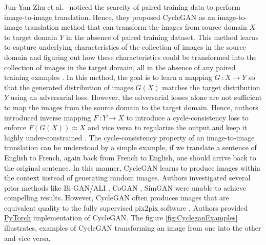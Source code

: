 Jun-Yan Zhu et al.\ \cite{zhu2020unpaired} noticed the scarcity of paired training data to perform image-to-image translation. Hence, they proposed \ac{CycleGAN} as an image-to-image translation method that can transform the images from source domain $X$ to target domain $Y$ in the absence of paired training dataset. This method learns to capture underlying characteristics of the collection of images in the source domain and figuring out how these characteristics could be transformed into the collection of images in the target domain, all in the absence of any paired training examples \cite{zhu2020unpaired}. In this method, the goal is to learn a mapping $G\ \colon X \rightarrow Y$ so that the generated distribution of images $G(X)$ matches the target distribution $Y$ using an adversarial loss. However, the adversarial losses alone are not sufficient to map the images from the source domain to the target domain. Hence, authors introduced inverse mapping $F\ \colon Y \rightarrow X$ to introduce a cycle-consistency loss to enforce $F(G(X))\approx X$ and vice versa to regularize the output and keep it highly under-constrained \cite{zhu2020unpaired}. The cycle-consistency property of an image-to-image translation can be understood by a simple example, if we translate a sentence of English to French, again back from French to English, one should arrive back to the original sentence. In this manner, \ac{CycleGAN} learns to produce images within the context instead of generating random images\footnotemark. Authors investigated several prior methods like Bi-GAN/ALI \cite{donahue2017adversarial} \cite{dumoulin2017adversarially}, CoGAN \cite{liu2016coupled}, SimGAN \cite{shrivastava2017learning} were unable to achieve compelling results. However, \ac{CycleGAN} often produces images that are equivalent quality to the fully supervised pix2pix software \cite{isola2018imagetoimage}. Authors provided \href{https://github.com/junyanz/pytorch-CycleGAN-and-pix2pix}{PyTorch} implementation of \ac{CycleGAN}. The figure \ref{fig:CycleganExamples} illustrates, examples of \ac{CycleGAN} transforming an image from one into the other and vice versa.


